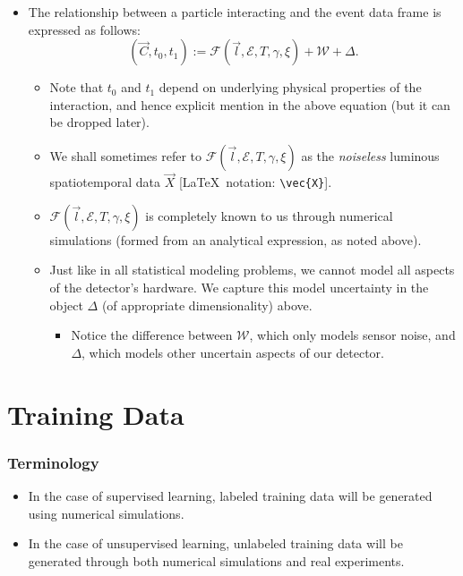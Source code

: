 \documentclass[]{article}
\providecommand{\tightlist}{%
  \setlength{\itemsep}{0pt}\setlength{\parskip}{0pt}}
\begin{document}
\begin{itemize}
\tightlist
\item
  The relationship between a particle interacting and the event data frame is expressed as follows:
  \[(\vec{C}, t_0, t_1) := \mathcal{F}(\vec{l}, \mathcal{E}, T, \gamma, \xi) + \mathcal{W} + \Delta.\]

  \begin{itemize}
  \tightlist
  \item
    Note that \(t_0\) and \(t_1\) depend on underlying physical properties of the interaction, and hence explicit mention in the above equation (but it can be dropped later).
  \item
    We shall sometimes refer to \(\mathcal{F}(\vec{l}, \mathcal{E}, T, \gamma, \xi)\) as the \emph{noiseless} luminous spatiotemporal data \(\vec{X}\) {[}{\color{blue}\LaTeX~notation: \verb|\vec{X}|}{]}.
  \item
    \(\mathcal{F}(\vec{l}, \mathcal{E}, T, \gamma, \xi)\) is completely known to us through numerical simulations (formed from an analytical expression, as noted above).
  \item
    Just like in all statistical modeling problems, we cannot model all aspects of the detector's hardware. We capture this model uncertainty in the object \(\Delta\) (of appropriate dimensionality) above.

    \begin{itemize}
    \tightlist
    \item
      Notice the difference between \(\mathcal{W}\), which only models sensor noise, and \(\Delta\), which models other uncertain aspects of our detector.
    \end{itemize}
  \end{itemize}
\end{itemize}


\section{Training Data}

\subsubsection{Terminology}

\begin{itemize}
\tightlist
\item
  In the case of supervised learning, labeled training data will be generated using numerical simulations.

\item
  In the case of unsupervised learning, unlabeled training data will be generated through both numerical simulations and real experiments.
\end{itemize}
\end{document}

